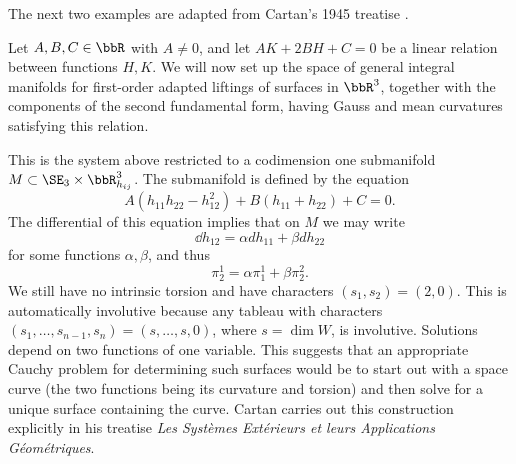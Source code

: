 The next two examples are adapted from Cartan's 1945 treatise \cite{cartan45}.
\begin{example}\label{ex Weingarten surfaces}
    Let $A,B,C\in\bbR$ with $A\neq 0$, and let $AK+2BH+C=0$ be a linear relation between functions $H,K$. We will now set up the space of general integral manifolds for first-order adapted liftings of surfaces in $\bbR^3$, together with the components of the second fundamental form, having Gauss and mean curvatures satisfying this relation.

    This is the system above restricted to a codimension one submanifold $M\subset \SE_3\times \bbR^3_{h_{ij}}$. The submanifold is defined by the equation 
    \[A(h_{11}h_{22}-h_{12}^2)+B(h_{11}+h_{22})+C=0.\]
    The differential of this equation implies that on $M$ we may write 
    \[\dd h_{12}=\alpha d h_{11}+\beta dh_{22}\]
    for some functions $\alpha,\beta$, and thus 
    \[\pi^1_2=\alpha\pi^1_1+\beta\pi^2_2.\]
    We still have no intrinsic torsion and have characters $(s_1,s_2)=(2,0)$.  This is automatically involutive because any tableau with characters $(s_1,\ldots,s_{n-1},s_n)=(s,\ldots,s,0)$, where $s=\dim W$, is involutive. Solutions depend on two functions of one variable. This suggests that an appropriate Cauchy problem for determining such surfaces would be to start out with a space curve (the two functions being its curvature and torsion) and then solve for a unique surface containing the curve. Cartan carries out this construction explicitly in his treatise \emph{Les Syst\`emes Ext\'erieurs et leurs Applications G\'eom\'etriques}.
\end{example} 

